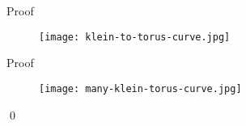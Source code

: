 \documentclass{beamer}
\theoremstyle{definition}
\theoremstyle{remark}
\begin{document}
\begin{frame}{Proof}
    \begin{figure}
        \centering
        \texttt{[image: klein-to-torus-curve.jpg]}
        \label{fig:enter-label}
    \end{figure}
\end{frame}

\begin{frame}{Proof}
    \begin{figure}
        \centering
        \texttt{[image: many-klein-torus-curve.jpg]}
        \label{fig:enter-label}
    \end{figure}
    \qed
\end{frame}
\end{document}
